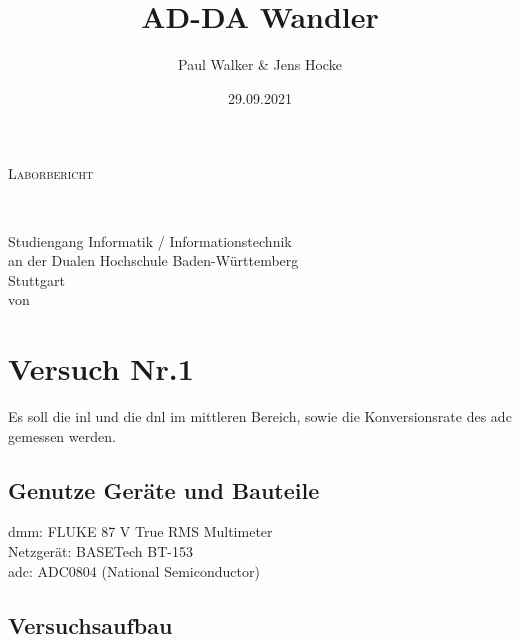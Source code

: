 \documentclass[12pt, a4paper, ngerman]{article}
\title{AD-DA Wandler}
\author{Paul Walker \& Jens Hocke}
\date{29.09.2021}
\newcommand{\Was}{Laborbericht}
\newcommand{\Studiengang}{Informatik / Informationstechnik}
\begin{document}
\makeatletter
\begin{titlepage}
  \begin{center}
    \vspace*{1cm}
    {\Huge\scshape \Was}\\[2cm]
    \begin{center}
      \linespread{1}\Huge \@title\\[2cm]
    \end{center}
    {\large Studiengang \Studiengang}\\
    {\large an der Dualen Hochschule Baden-Württemberg\\ Stuttgart}\\[2cm]
    {\large von}\\
    {\large\bfseries \@author}
    \vfill
  \end{center}
\end{titlepage}
\makeatother

\tableofcontents

\newpage
\thispagestyle{simple}
\printacronyms[name=Abkürzungsverzeichnis, heading=section*]
\newpage

\section{Versuch Nr.1}

Es soll die \ac{inl} und die \ac{dnl} im mittleren Bereich,
sowie die Konversionsrate des \ac{adc} gemessen werden.

\subsection{Genutze Geräte und Bauteile}

\ac{dmm}: FLUKE 87 V True RMS Multimeter \\
Netzgerät: BASETech BT-153 \\
\ac{adc}: ADC0804 (National Semiconductor)

\subsection{Versuchsaufbau}
\end{document}
